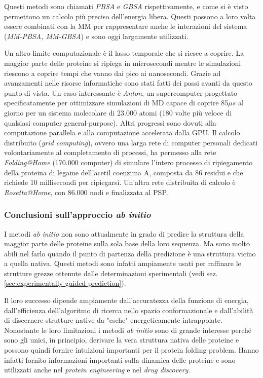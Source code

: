 {\par Questi metodi sono chiamati \textit{PBSA} e \textit{GBSA} rispettivamente, e come si è visto permettono un calcolo più preciso dell'energia libera. Questi possono a loro volta essere combinati con la MM per rappresentare anche le interazioni del sistema (\textit{MM-PBSA, MM-GBSA}) e sono oggi largamente utilizzati.

\par Un altro limite computazionale è il lasso temporale che si riesce a coprire. La maggior parte delle proteine si ripiega in microsecondi mentre le simulazioni riescono a coprire tempi che vanno dai pico ai nanosecondi. Grazie ad avanzamenti nelle risorse informatiche sono stati fatti dei passi avanti da questo punto di vista. Un caso interessante è \textit{Anton}, un supercomputer progettato specificatamente per ottimizzare simulazioni di MD capace di coprire 85$\mu s$ al giorno per un sistema molecolare di 23.000 atomi (180 volte più veloce di qualsiasi computer general-purpose). Altri progressi sono dovuti alla computazione parallela e alla computazione accelerata dalla GPU. Il calcolo distribuito (\textit{grid computing}), ovvero una larga rete di computer personali dedicati volontariamente al completamento di processi, ha permesso alla rete \textit{Folding@Home} (170.000 computer) di simulare l'intero processo di ripiegamento della proteina di legame dell'acetil coenzima A, composta da 86 residui e che richiede 10 millisecondi per ripiegarsi. Un'altra rete distribuita di calcolo è \textit{Rosetta@Home}, con 86.000 nodi e finalizzata al PSP. \\

\subsubsection{Conclusioni sull'approccio \textit{ab initio}}
I metodi \textit{ab initio} non sono attualmente in grado di predire la struttura della maggior parte delle proteine sulla sola base della loro sequenza. Ma sono molto abili nel farlo quando il punto di partenza della predizione è una struttura vicino a quella nativa. Questi metodi sono infatti ampiamente usati per raffinare le strutture grezze ottenute dalle determinazioni sperimentali (vedi sez. \ref{sec:experimentally-guided-prediction}). 

\par Il loro successo dipende ampiamente dall'accuratezza della funzione di energia, dall'efficienza dell'algoritmo di ricerca nello spazio conformazionale e dall'abilità di discernere strutture native da "esche" energeticamente intrappolate.
Nonostante le loro limitazioni i metodi \textit{ab initio} sono di grande interesse perché sono gli unici, in principio, derivare la vera struttura nativa delle proteine e possono quindi fornire intuizioni importanti per il protein folding problem. Hanno infatti fornito informazioni importanti sulla dinamica delle proteine e sono utilizzati anche nel \textit{protein engineering} e nel \textit{drug discovery}. 

}


